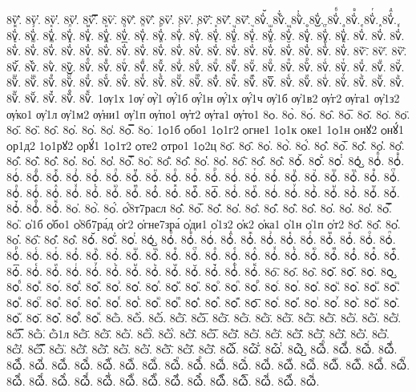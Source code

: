 {8ѷ҆̑.
8ѷ҆̓.
8ѷ҆̔.
8ѷ҆̾.
8ѷ҆̿.
8ѷ҆͘.
8ѷ҆҃.
8ѷ҆҄.
8ѷ҆҅.
8ѷ҆҆.
8ѷ҆҇.
8ѷ҆᷀.
8ѷ҆᷁.
8ѷ҆᷶.
8ѷ᷷҆.
8ѷ᷸҆.
8ѷ᷹҆.
8ѷ҆ⷠ.
8ѷ҆ⷡ.
8ѷ҆ⷢ.
8ѷ҆ⷣ.
8ѷ҆ⷤ.
8ѷ҆ⷥ.
8ѷ҆ⷦ.
8ѷ҆ⷧ.
8ѷ҆ⷨ.
8ѷ҆ⷩ.
8ѷ҆ⷪ.
8ѷ҆ⷫ.
8ѷ҆ⷬ.
8ѷ҆ⷭ.
8ѷ҆ⷮ.
8ѷ҆ⷯ.
8ѷ҆ⷰ.
8ѷ҆ⷱ.
8ѷ҆ⷲ.
8ѷ҆ⷳ.
8ѷ҆ⷴ.
8ѷ҆ⷵ.
8ѷ҆ⷶ.
8ѷ҆ⷷ.
8ѷ҆ⷸ.
8ѷ҆ⷹ.
8ѷ҆ⷺ.
8ѷ҆ⷻ.
8ѷ҆ⷼ.
8ѷ҆ⷽ.
8ѷ҆ⷾ.
8ѷ҆ⷿ.
8ѷ҆꙯.
8ѷ҆ꙴ.
8ѷ҆ꙵ.
8ѷ҆ꙶ.
8ѷ҆ꙷ.
8ѷ҆ꙸ.
8ѷ҆ꙹ.
8ѷ҆ꙺ.
8ѷ҆ꙻ.
8ѷ҆꙼.
8ѷ҆꙽.
8ѷ҆ꚞ.
8ѷ҆ꚟ.
8ѷ҇.
8ѷ᷀.
8ѷ᷁.
8ѷ᷶.
8ѷ᷷.
8ѷ᷸.
8ѷ᷹.
8ѷⷠ.
8ѷⷡ.
8ѷⷢ.
8ѷⷣ.
8ѷⷤ.
8ѷⷥ.
8ѷⷦ.
8ѷⷧ.
8ѷⷨ.
8ѷⷩ.
8ѷⷪ.
8ѷⷫ.
8ѷⷬ.
8ѷⷭ.
8ѷⷮ.
8ѷⷯ.
8ѷⷰ.
8ѷⷱ.
8ѷⷲ.
8ѷⷳ.
8ѷⷴ.
8ѷⷵ.
8ѷⷶ.
8ѷⷷ.
8ѷⷸ.
8ѷⷹ.
8ѷⷺ.
8ѷⷻ.
8ѷⷼ.
8ѷⷽ.
8ѷⷾ.
8ѷⷿ.
8ѷ꙯.
8ѷꙴ.
8ѷꙵ.
8ѷꙶ.
8ѷꙷ.
8ѷꙸ.
8ѷꙹ.
8ѷꙺ.
8ѷꙻ.
8ѷ꙼.
8ѷ꙽.
8ѷꚞ.
8ѷꚟ.
1ѹ1х
1ѹ҆
ѹ҆̀1
ѹ҆́1б
ѹ҆́1н
ѹ҆́1х
ѹ҆́1ч
ѹ҆1б
ѹ҆1в2
ѹ҆г2
ѹ҆га1
ѹ҆1з2
ѹ҆ко1
ѹ҆1л
ѹ҆1м2
ѹ҆ни1
ѹ҆1п
ѹ҆по1
ѹ҆т2
ѹ҆та1
ѹ҆то1
8ѻ.
8ѻ̀.
8ѻ́.
8ѻ̂.
8ѻ̅.
8ѻ̆.
8ѻ̇.
8ѻ̈.
8ѻ̋.
8ѻ̏.
8ѻ̑.
8ѻ̓.
8ѻ̔.
8ѻ̾.
8ѻ̿.
8ѻ͘.
1ѻ1б
ѻбо1
1ѻ1г2
ѻгне1
1ѻ1к
ѻке1
1ѻ1н
ѻнꙋ2
ѻнꙋ́1
ѻр1д2
1ѻ1рꙋ2
ѻрꙋ́1
1ѻ1т2
ѻте2
ѻтро1
1ѻ2ц
8ѻ҃.
8ѻ҄.
8ѻ҅.
8ѻ҅̀.
8ѻ҅́.
8ѻ҅̂.
8ѻ҅̅.
8ѻ҅̆.
8ѻ҅̇.
8ѻ҅̈.
8ѻ҅̋.
8ѻ҅̏.
8ѻ҅̑.
8ѻ҅̓.
8ѻ҅̔.
8ѻ҅̾.
8ѻ҅̿.
8ѻ҅͘.
8ѻ҅҃.
8ѻ҅҄.
8ѻ҅҅.
8ѻ҅҆.
8ѻ҅҇.
8ѻ҅᷀.
8ѻ҅᷁.
8ѻ҅᷶.
8ѻ᷷҅.
8ѻ᷸҅.
8ѻ᷹҅.
8ѻ҅ⷠ.
8ѻ҅ⷡ.
8ѻ҅ⷢ.
8ѻ҅ⷣ.
8ѻ҅ⷤ.
8ѻ҅ⷥ.
8ѻ҅ⷦ.
8ѻ҅ⷧ.
8ѻ҅ⷨ.
8ѻ҅ⷩ.
8ѻ҅ⷪ.
8ѻ҅ⷫ.
8ѻ҅ⷬ.
8ѻ҅ⷭ.
8ѻ҅ⷮ.
8ѻ҅ⷯ.
8ѻ҅ⷰ.
8ѻ҅ⷱ.
8ѻ҅ⷲ.
8ѻ҅ⷳ.
8ѻ҅ⷴ.
8ѻ҅ⷵ.
8ѻ҅ⷶ.
8ѻ҅ⷷ.
8ѻ҅ⷸ.
8ѻ҅ⷹ.
8ѻ҅ⷺ.
8ѻ҅ⷻ.
8ѻ҅ⷼ.
8ѻ҅ⷽ.
8ѻ҅ⷾ.
8ѻ҅ⷿ.
8ѻ҅꙯.
8ѻ҅ꙴ.
8ѻ҅ꙵ.
8ѻ҅ꙶ.
8ѻ҅ꙷ.
8ѻ҅ꙸ.
8ѻ҅ꙹ.
8ѻ҅ꙺ.
8ѻ҅ꙻ.
8ѻ҅꙼.
8ѻ҅꙽.
8ѻ҅ꚞ.
8ѻ҅ꚟ.
8ѻ҆.
8ѻ҆̀.
8ѻ҆́.
ѻ҆́8т7расл
8ѻ҆̂.
8ѻ҆̅.
8ѻ҆̆.
8ѻ҆̇.
8ѻ҆̈.
8ѻ҆̋.
8ѻ҆̏.
8ѻ҆̑.
8ѻ҆̓.
8ѻ҆̔.
8ѻ҆̾.
8ѻ҆̿.
8ѻ҆͘.
ѻ҆1б
ѻ҆бо1
ѻ҆8б7ра́д
ѻ҆г2
ѻ҆гне7зра́
ѻ҆ди1
ѻ҆1з2
ѻ҆к2
ѻ҆ка1
ѻ҆1н
ѻ҆1п
ѻ҆т2
8ѻ҆҃.
8ѻ҆҄.
8ѻ҆҅.
8ѻ҆҆.
8ѻ҆҇.
8ѻ҆᷀.
8ѻ҆᷁.
8ѻ҆᷶.
8ѻ᷷҆.
8ѻ᷸҆.
8ѻ᷹҆.
8ѻ҆ⷠ.
8ѻ҆ⷡ.
8ѻ҆ⷢ.
8ѻ҆ⷣ.
8ѻ҆ⷤ.
8ѻ҆ⷥ.
8ѻ҆ⷦ.
8ѻ҆ⷧ.
8ѻ҆ⷨ.
8ѻ҆ⷩ.
8ѻ҆ⷪ.
8ѻ҆ⷫ.
8ѻ҆ⷬ.
8ѻ҆ⷭ.
8ѻ҆ⷮ.
8ѻ҆ⷯ.
8ѻ҆ⷰ.
8ѻ҆ⷱ.
8ѻ҆ⷲ.
8ѻ҆ⷳ.
8ѻ҆ⷴ.
8ѻ҆ⷵ.
8ѻ҆ⷶ.
8ѻ҆ⷷ.
8ѻ҆ⷸ.
8ѻ҆ⷹ.
8ѻ҆ⷺ.
8ѻ҆ⷻ.
8ѻ҆ⷼ.
8ѻ҆ⷽ.
8ѻ҆ⷾ.
8ѻ҆ⷿ.
8ѻ҆꙯.
8ѻ҆ꙴ.
8ѻ҆ꙵ.
8ѻ҆ꙶ.
8ѻ҆ꙷ.
8ѻ҆ꙸ.
8ѻ҆ꙹ.
8ѻ҆ꙺ.
8ѻ҆ꙻ.
8ѻ҆꙼.
8ѻ҆꙽.
8ѻ҆ꚞ.
8ѻ҆ꚟ.
8ѻ҇.
8ѻ᷀.
8ѻ᷁.
8ѻ᷶.
8ѻ᷷.
8ѻ᷸.
8ѻ᷹.
8ѻⷠ.
8ѻⷡ.
8ѻⷢ.
8ѻⷣ.
8ѻⷤ.
8ѻⷥ.
8ѻⷦ.
8ѻⷧ.
8ѻⷨ.
8ѻⷩ.
8ѻⷪ.
8ѻⷫ.
8ѻⷬ.
8ѻⷭ.
8ѻⷮ.
8ѻⷯ.
8ѻⷰ.
8ѻⷱ.
8ѻⷲ.
8ѻⷳ.
8ѻⷴ.
8ѻⷵ.
8ѻⷶ.
8ѻⷷ.
8ѻⷸ.
8ѻⷹ.
8ѻⷺ.
8ѻⷻ.
8ѻⷼ.
8ѻⷽ.
8ѻⷾ.
8ѻⷿ.
8ѻ꙯.
8ѻꙴ.
8ѻꙵ.
8ѻꙶ.
8ѻꙷ.
8ѻꙸ.
8ѻꙹ.
8ѻꙺ.
8ѻꙻ.
8ѻ꙼.
8ѻ꙽.
8ѻꚞ.
8ѻꚟ.
8ѽ.
8ѽ̀.
8ѽ́.
8ѽ̂.
8ѽ̅.
8ѽ̆.
8ѽ̇.
8ѽ̈.
8ѽ̋.
8ѽ̏.
8ѽ̑.
8ѽ̓.
8ѽ̔.
8ѽ̾.
8ѽ̿.
8ѽ͘.
ѽ1л
8ѽ҃.
8ѽ҄.
8ѽ҅.
8ѽ҅̀.
8ѽ҅́.
8ѽ҅̂.
8ѽ҅̅.
8ѽ҅̆.
8ѽ҅̇.
8ѽ҅̈.
8ѽ҅̋.
8ѽ҅̏.
8ѽ҅̑.
8ѽ҅̓.
8ѽ҅̔.
8ѽ҅̾.
8ѽ҅̿.
8ѽ҅͘.
8ѽ҅҃.
8ѽ҅҄.
8ѽ҅҅.
8ѽ҅҆.
8ѽ҅҇.
8ѽ҅᷀.
8ѽ҅᷁.
8ѽ҅᷶.
8ѽ᷷҅.
8ѽ᷸҅.
8ѽ᷹҅.
8ѽ҅ⷠ.
8ѽ҅ⷡ.
8ѽ҅ⷢ.
8ѽ҅ⷣ.
8ѽ҅ⷤ.
8ѽ҅ⷥ.
8ѽ҅ⷦ.
8ѽ҅ⷧ.
8ѽ҅ⷨ.
8ѽ҅ⷩ.
8ѽ҅ⷪ.
8ѽ҅ⷫ.
8ѽ҅ⷬ.
8ѽ҅ⷭ.
8ѽ҅ⷮ.
8ѽ҅ⷯ.
8ѽ҅ⷰ.
8ѽ҅ⷱ.
8ѽ҅ⷲ.
8ѽ҅ⷳ.
8ѽ҅ⷴ.
8ѽ҅ⷵ.
8ѽ҅ⷶ.
8ѽ҅ⷷ.
8ѽ҅ⷸ.
8ѽ҅ⷹ.
8ѽ҅ⷺ.
8ѽ҅ⷻ.
8ѽ҅ⷼ.
8ѽ҅ⷽ.
8ѽ҅ⷾ.
8ѽ҅ⷿ.
8ѽ҅꙯.
8ѽ҅ꙴ.
8ѽ҅ꙵ.
8ѽ҅ꙶ.
}
